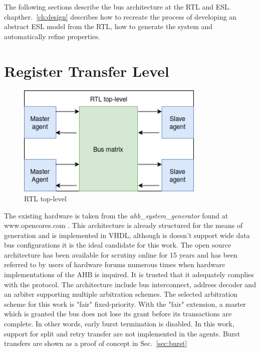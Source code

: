 The following sections describe the bus architecture at the RTL and ESL. chapther.~\ref{ch:design} describes how to recreate the process of developing an abstract ESL model from the RTL, how to generate the system and automatically refine properties.  
\newpage

\section{Register Transfer Level}
\begin{figure}[hbt]
    \begin{center}
        \includegraphics[width=0.8\textwidth]{figs/hw/RTL_top.png}
    \end{center}
    \caption{RTL top-level}
    \label{fig:rtl-top}
\end{figure}

The existing hardware is taken from the \textit{ahb\_system\_generator} found at \\
 www.opencores.com \cite{ahbsys}. This architecture is already structured for the means of generation and is implemented in VHDL, although is doesn't support wide data bus configurations it is the ideal candidate for this work. The open source architecture has been available for scrutiny online for 15 years and has been referred to by users of hardware forums numerous times when hardware implementations of the AHB is inquired. It is trusted that it adequately complies with the protocol. The architecture include bus interconnect, address decoder and an arbiter supporting multiple arbitration schemes. The selected arbitration scheme for this work is "fair" fixed-priority. With the "fair" extension, a master which is granted the bus does not lose its grant before its transactions are complete. In other words, early burst termination is disabled. In this work, support for split and retry transfer are not implemented in the agents. Burst transfers are shown as a proof of concept in Sec.~\ref{sec:burst}

